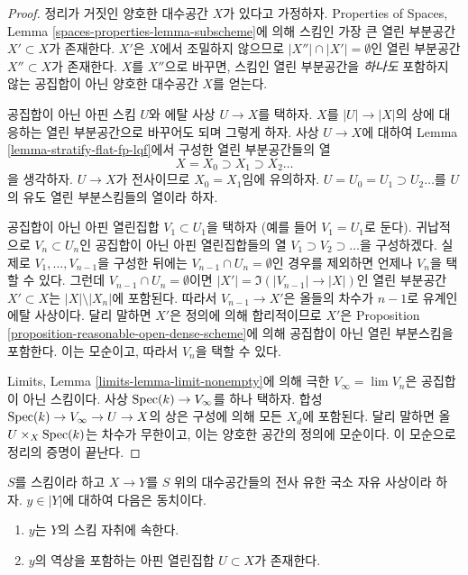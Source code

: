 \begin{proof}
정리가 거짓인 양호한 대수공간 $X$가 있다고 가정하자.
Properties of Spaces, Lemma \ref{spaces-properties-lemma-subscheme}에
의해 스킴인 가장 큰 열린 부분공간 $X' \subset X$가 존재한다.
$X'$은 $X$에서 조밀하지 않으므로
$|X''| \cap |X'| = \emptyset$인 열린 부분공간 $X'' \subset X$가
존재한다. $X$를 $X''$으로 바꾸면, 스킴인 열린 부분공간을
{\it 하나도} 포함하지 않는 공집합이 아닌 양호한 대수공간 $X$를 얻는다.

\medskip\noindent
공집합이 아닌 아핀 스킴 $U$와 에탈 사상 $U \to X$를 택하자.
$X$를 $|U| \to |X|$의 상에 대응하는 열린 부분공간으로 바꾸어도
되며 그렇게 하자. 사상 $U \to X$에 대하여 Lemma
\ref{lemma-stratify-flat-fp-lqf}에서 구성한 열린 부분공간들의 열
$$
X = X_0 \supset X_1 \supset X_2 \ldots
$$
을 생각하자. $U \to X$가 전사이므로 $X_0 = X_1$임에 유의하자.
$U = U_0 = U_1 \supset U_2 \ldots$를 $U$의 유도 열린
부분스킴들의 열이라 하자.

\medskip\noindent
공집합이 아닌 아핀 열린집합 $V_1 \subset U_1$을 택하자
(예를 들어 $V_1 = U_1$로 둔다). 귀납적으로
$V_n \subset U_n$인 공집합이 아닌 아핀 열린집합들의 열
$V_1 \supset V_2 \supset \ldots$을 구성하겠다.
실제로 $V_1, \ldots, V_{n - 1}$을 구성한 뒤에는
$V_{n - 1} \cap U_n = \emptyset$인 경우를 제외하면 언제나
$V_n$을 택할 수 있다. 그런데
$V_{n - 1} \cap U_n = \emptyset$이면
$|X'| = \Im(|V_{n - 1}| \to |X|)$인 열린 부분공간
$X' \subset X$는 $|X| \setminus |X_n|$에 포함된다.
따라서 $V_{n - 1} \to X'$은 올들의 차수가 $n - 1$로 유계인 에탈
사상이다. 달리 말하면 $X'$은 정의에 의해 합리적이므로 $X'$은
Proposition \ref{proposition-reasonable-open-dense-scheme}에 의해 공집합이 아닌
열린 부분스킴을 포함한다. 이는 모순이고, 따라서 $V_n$을 택할 수 있다.

\medskip\noindent
Limits, Lemma \ref{limits-lemma-limit-nonempty}에 의해 극한
$V_\infty = \lim V_n$은 공집합이 아닌 스킴이다.
사상 $\mathop{\mathrm{Spec}}(k) \to V_\infty$를 하나 택하자.
합성 $\mathop{\mathrm{Spec}}(k) \to V_\infty \to U \to X$의 상은 구성에 의해
모든 $X_d$에 포함된다. 달리 말하면
올 $U \times_X \mathop{\mathrm{Spec}}(k)$는 차수가 무한이고, 이는 양호한 공간의
정의에 모순이다. 이 모순으로 정리의 증명이 끝난다.
\end{proof}

\begin{lemma}
\label{lemma-when-quotient-scheme-at-point}
$S$를 스킴이라 하고 $X \to Y$를 $S$ 위의 대수공간들의 전사
유한 국소 자유 사상이라 하자. $y \in |Y|$에 대하여 다음은 동치이다.
\begin{enumerate}
\item $y$는 $Y$의 스킴 자취에 속한다.
\item $y$의 역상을 포함하는 아핀 열린집합 $U \subset X$가 존재한다.
\end{enumerate}
\end{lemma}

